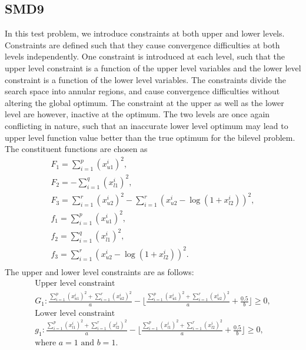 \documentclass[twoside]{article}
\begin{document}
\subsection{SMD9}
In this test problem, we introduce constraints at both upper and lower levels. Constraints are defined such that they cause convergence difficulties at both levels independently. One constraint is introduced at each level, such that the upper level constraint is a function of the upper level variables and the lower level constraint is a function of the lower level variables. The constraints divide the search space into annular regions, and cause convergence difficulties without altering the global optimum. The constraint at the upper as well as the lower level are however, inactive at the optimum. The two levels are once again conflicting in nature, such that an inaccurate lower level optimum may lead to upper level function value better than the true optimum for the bilevel problem. The constituent functions are chosen as
\begin{equation}
\begin{array}{l}
F_1 = \sum_{i=1}^{p} (x_{u1}^{i})^2,\\
F_2 = - \sum_{i=1}^{q} (x_{l1}^{i})^2,\\
F_3 = \sum_{i=1}^{r} (x_{u2}^{i})^2 - \sum_{i=1}^{r} (x_{u2}^{i} - \log (1+x_{l2}^{i}))^2,\\
f_1 = \sum_{i=1}^{p} (x_{u1}^{i})^2,\\
f_2 = \sum_{i=1}^{q} (x_{l1}^{i})^2,\\
f_3 = \sum_{i=1}^{r} (x_{u2}^{i} - \log (1+x_{l2}^{i}))^2.\\
\end{array}
\end{equation}
The upper and lower level constraints are as follows:
\begin{equation}
\begin{array}{l}
\mbox{Upper level constraint}\\
G_1: \frac{\sum_{i=1}^{p} (x_{u1}^{i})^2 + \sum_{i=1}^{r} (x_{u2}^{i})^2}{a} - \Big\lfloor \frac{\sum_{i=1}^{p} (x_{u1}^{i})^2 + \sum_{i=1}^{r} (x_{u2}^{i})^2}{a} + \frac{0.5}{b}\Big\rfloor \ge0,\\
\mbox{Lower level constraint}\\
g_1: \frac{\sum_{i=1}^{p} (x_{l1}^{i})^2 + \sum_{i=1}^{r} (x_{l2}^{i})^2}{a} - \Big\lfloor \frac{\sum_{i=1}^{p} (x_{l1}^{i})^2 + \sum_{i=1}^{r} (x_{l2}^{i})^2}{a} + \frac{0.5}{b}\Big\rfloor \ge0,\\
\mbox{where } a = 1 \mbox{ and } b = 1.
\end{array}
\end{equation}
\end{document}
